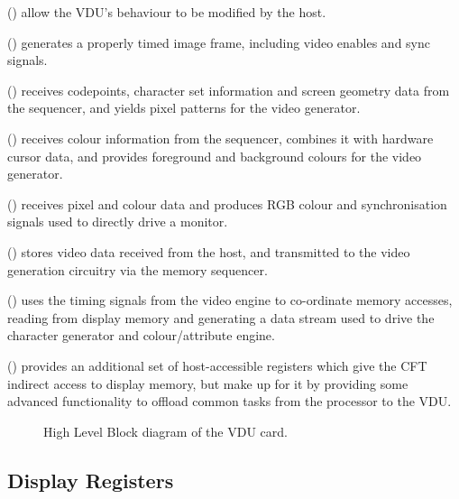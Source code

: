 \begin{description}

 () allow the VDU's
behaviour to be modified by the host.

 () generates a properly timed
image frame, including video enables and sync signals.

 () receives codepoints,
character set information and screen geometry data from the sequencer, and
yields pixel patterns for the video generator.

 () receives colour
information from the sequencer, combines it with hardware cursor data, and
provides foreground and background colours for the video generator.

 () receives pixel and
colour data and produces RGB colour and synchronisation signals used to
directly drive a monitor.

 () stores video data received
from the host, and transmitted to the video generation circuitry via the memory
sequencer.

 () uses the timing
signals from the video engine to co-ordinate memory accesses, reading from
display memory and generating a data stream used to drive the character
generator and colour/attribute engine.

 () provides an additional
set of host-accessible registers which give the CFT indirect access to display
memory, but make up for it by providing some advanced functionality to offload
common tasks from the processor to the VDU.

\end{description}


\begin{figure}
 \centering
 
 \caption[High Level Block Diagram of the VDU
   Card]{\label{fig:vdu:block-diagram} High Level Block diagram of the VDU
   card.}
\end{figure}


\subsection{Display Registers}
\label{sec:vdu:display-registers}

